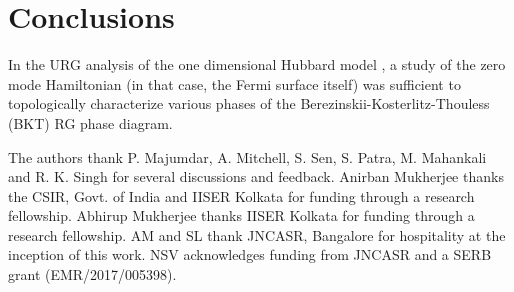 \documentclass[reprint,prb,superscriptaddress]{revtex4-2}
\begin{document}
\section{Conclusions}
\lipsum[1-5]

In the URG analysis of the one dimensional Hubbard model \cite{1dhubjhep}, a study of the zero mode Hamiltonian (in that case, the Fermi surface itself) was sufficient to topologically characterize various phases of the Berezinskii-Kosterlitz-Thouless (BKT) RG phase diagram. 


\acknowledgments
The authors thank P. Majumdar, A. Mitchell, S. Sen, S. Patra, M. Mahankali and R. K. Singh for several discussions and feedback. Anirban Mukherjee thanks the CSIR, Govt. of India and IISER Kolkata for funding through a research fellowship. Abhirup Mukherjee thanks IISER Kolkata for funding through a research fellowship. AM and SL thank JNCASR, Bangalore for hospitality at the inception of this work. NSV acknowledges funding from JNCASR and a SERB grant (EMR/2017/005398).


\end{document}
